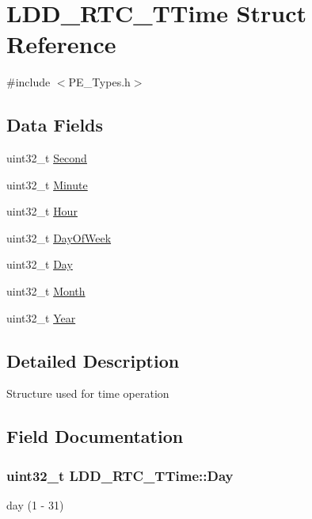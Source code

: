 \hypertarget{struct_l_d_d___r_t_c___t_time}{}\section{L\+D\+D\+\_\+\+R\+T\+C\+\_\+\+T\+Time Struct Reference}
\label{struct_l_d_d___r_t_c___t_time}


{\ttfamily \#include $<$P\+E\+\_\+\+Types.\+h$>$}

\subsection*{Data Fields}
\begin{DoxyCompactItemize}
\item 
uint32\+\_\+t \hyperlink{struct_l_d_d___r_t_c___t_time_ab6c770706c18542e856d56398850ac9e}{Second}
\item 
uint32\+\_\+t \hyperlink{struct_l_d_d___r_t_c___t_time_a5cd7a1478dd5dd319fb5837bfbf5459f}{Minute}
\item 
uint32\+\_\+t \hyperlink{struct_l_d_d___r_t_c___t_time_ade2d4bed82069483da14cfe2ede6fef9}{Hour}
\item 
uint32\+\_\+t \hyperlink{struct_l_d_d___r_t_c___t_time_a43ba06409c4d35f48d732cb61ff5aed0}{Day\+Of\+Week}
\item 
uint32\+\_\+t \hyperlink{struct_l_d_d___r_t_c___t_time_acc1084e0fd686c588a2947c2f109634f}{Day}
\item 
uint32\+\_\+t \hyperlink{struct_l_d_d___r_t_c___t_time_a2de1da3c8e42665975c2469125b04dfd}{Month}
\item 
uint32\+\_\+t \hyperlink{struct_l_d_d___r_t_c___t_time_a16fbfb74b239e4b5e1889fe19d025d5e}{Year}
\end{DoxyCompactItemize}


\subsection{Detailed Description}
Structure used for time operation 

\subsection{Field Documentation}
\subsubsection[{\texorpdfstring{Day}{Day}}]{\setlength{\rightskip}{0pt plus 5cm}uint32\+\_\+t L\+D\+D\+\_\+\+R\+T\+C\+\_\+\+T\+Time\+::\+Day}\hypertarget{struct_l_d_d___r_t_c___t_time_acc1084e0fd686c588a2947c2f109634f}{}\label{struct_l_d_d___r_t_c___t_time_acc1084e0fd686c588a2947c2f109634f}
day (1 -\/ 31) 
